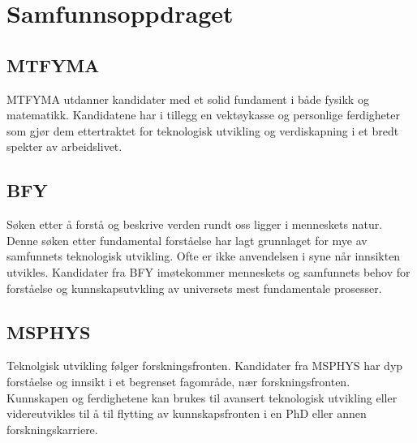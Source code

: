 \chapter{Samfunnsoppdraget}
\label{c:mission}

\section{MTFYMA}
MTFYMA utdanner kandidater med et solid fundament i både fysikk og matematikk. 
Kandidatene har i tillegg en vektøykasse og personlige ferdigheter som gjør dem ettertraktet for teknologisk utvikling og verdiskapning i et bredt spekter av arbeidslivet.

\section{BFY}
Søken etter å forstå og beskrive verden rundt oss ligger i menneskets natur. Denne søken etter fundamental forståelse har lagt grunnlaget for mye av samfunnets teknologisk utvikling. Ofte er ikke anvendelsen i syne når innsikten utvikles. Kandidater fra BFY imøtekommer menneskets og samfunnets behov for forståelse og kunnskapsutvkling av universets mest fundamentale prosesser.

\section{MSPHYS}
Teknolgisk utvikling følger forskningsfronten. Kandidater fra MSPHYS har dyp forståelse og innsikt i et begrenset fagområde, nær forskningsfronten. Kunnskapen og ferdighetene kan brukes til avansert teknologisk utvikling eller videreutvikles til å til flytting av kunnskapsfronten i en PhD eller annen forskningskarriere.